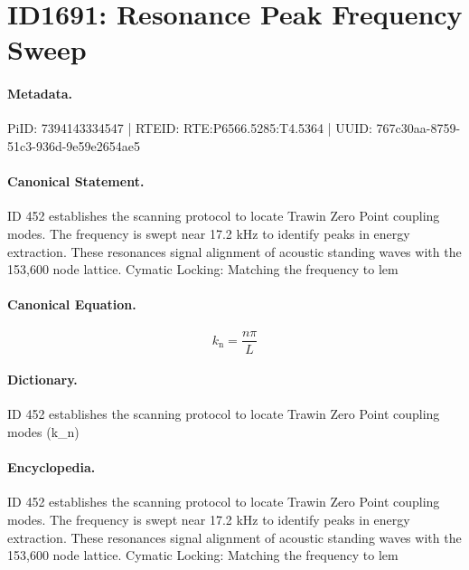 \section*{ID1691: Resonance Peak Frequency Sweep}
\paragraph{Metadata.}
PiID: 7394143334547 | RTEID: RTE:P6566.5285:T4.5364 | UUID: 767c30aa-8759-51c3-936d-9e59e2654ae5

\paragraph{Canonical Statement.}
ID 452 establishes the scanning protocol to locate Trawin Zero Point coupling modes. The frequency is swept near 17.2 kHz to identify peaks in energy extraction. These resonances signal alignment of acoustic standing waves with the 153,600 node lattice. Cymatic Locking: Matching the frequency to lem

\paragraph{Canonical Equation.}
\[
k_{\mathrm{n}} = \frac{n\pi}{L}
\]

\paragraph{Dictionary.}
ID 452 establishes the scanning protocol to locate Trawin Zero Point coupling modes (k\_n)

\paragraph{Encyclopedia.}
ID 452 establishes the scanning protocol to locate Trawin Zero Point coupling modes. The frequency is swept near 17.2 kHz to identify peaks in energy extraction. These resonances signal alignment of acoustic standing waves with the 153,600 node lattice. Cymatic Locking: Matching the frequency to lem

